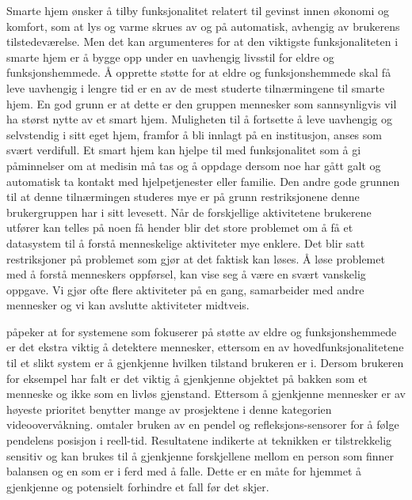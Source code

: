Smarte hjem ønsker å tilby funksjonalitet relatert til gevinst innen økonomi og komfort, som at lys og varme skrues av og på automatisk, avhengig av brukerens tilstedeværelse. Men det kan argumenteres for at den viktigste funksjonaliteten i smarte hjem er å bygge opp under en uavhengig livsstil for eldre og funksjonshemmede. Å opprette støtte for at eldre og funksjonshemmede skal få leve uavhengig i lengre tid er en av de mest studerte tilnærmingene til smarte hjem. En god grunn er at dette er den gruppen mennesker som sannsynligvis vil ha størst nytte av et smart hjem. Muligheten til å fortsette å leve uavhengig og selvstendig i sitt eget hjem, framfor å bli innlagt på en institusjon, anses som svært verdifull. Et smart hjem kan hjelpe til med funksjonalitet som å gi påminnelser om at medisin må tas og å oppdage dersom noe har gått galt og automatisk ta kontakt med hjelpetjenester eller familie. Den andre gode grunnen til at denne tilnærmingen studeres mye er på grunn restriksjonene denne brukergruppen har i sitt levesett. Når de forskjellige aktivitetene brukerene utfører kan telles på noen få hender blir det store problemet om å få et datasystem til å forstå menneskelige aktiviteter mye enklere. Det blir satt restriksjoner på problemet som gjør at det faktisk kan løses. Å løse problemet med å forstå menneskers oppførsel, kan vise seg å være en svært vanskelig oppgave. Vi gjør ofte flere aktiviteter på en gang, samarbeider med andre mennesker og vi kan avslutte aktiviteter midtveis.

\citet{desilva12} påpeker at for systemene som fokuserer på støtte av eldre og funksjonshemmede er det ekstra viktig å detektere mennesker, ettersom en av hovedfunksjonalitetene til et slikt system er å gjenkjenne hvilken tilstand brukeren er i. Dersom brukeren for eksempel har falt er det viktig å gjenkjenne objektet på bakken som et menneske og ikke som en livløs gjenstand. Ettersom å gjenkjenne mennesker er av høyeste prioritet benytter mange av prosjektene i denne kategorien videoovervåkning. \citet{elliot09} omtaler bruken av en pendel og refleksjons-sensorer for å følge pendelens posisjon i reell-tid. Resultatene indikerte at teknikken er tilstrekkelig sensitiv og kan brukes til å gjenkjenne forskjellene mellom en person som finner balansen og en som er i ferd med å falle. Dette er en måte for hjemmet å gjenkjenne og potensielt forhindre et fall før det skjer.

